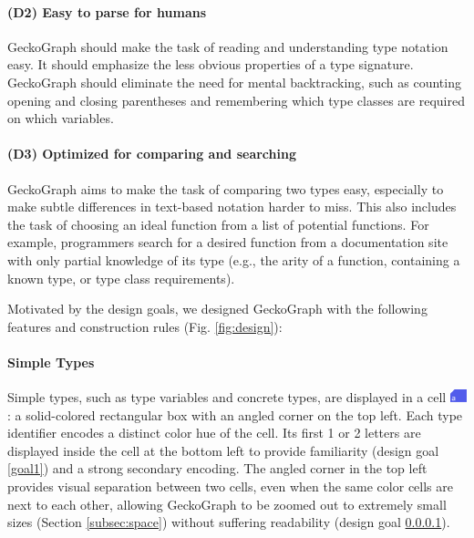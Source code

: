 \documentclass[preprint,12pt]{elsarticle}
\begin{document}
\paragraph{\textbf{(D2) Easy to parse for humans}}  \label{goal2} GeckoGraph should make the task of reading and understanding type notation easy. It should emphasize the less obvious properties of a type signature. GeckoGraph should eliminate the need for mental backtracking, such as counting opening and closing parentheses and remembering which type classes are required on which variables. 

\paragraph{\textbf{(D3) Optimized for comparing and searching}} \label{goal3} GeckoGraph aims to make the task of comparing two types easy, especially to make subtle differences in text-based notation harder to miss. This also includes the task of choosing an ideal function from a list of potential functions. For example, programmers search for a desired function from a documentation site with only partial knowledge of its type (e.g., the arity of a function, containing a known type, or type class requirements). 

Motivated by the design goals, we designed GeckoGraph with the following features and construction rules (Fig. \ref{fig:design}):

\paragraph{Simple Types} 
Simple types, such as type variables and concrete types, are displayed in a cell \includegraphics[height=1em]{figures/SimpleType}: a solid-colored rectangular box with an angled corner on the top left. Each type identifier encodes a distinct color hue of the cell. Its first 1 or 2 letters are displayed inside the cell at the bottom left to provide familiarity (design goal \ref{goal1}) and a strong secondary encoding. The angled corner in the top left provides visual separation between two cells, even when the same color cells are next to each other, allowing GeckoGraph to be zoomed out to extremely small sizes (Section \ref{subsec:space}) without suffering readability (design goal \ref{goal2}).
\end{document}
